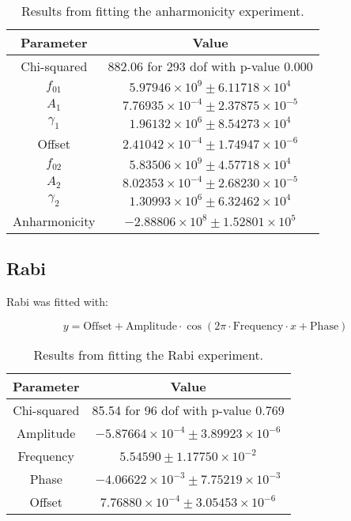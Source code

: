 \begin{table}[h]
\centering
\begin{tabular}{|c|c|}
\hline
Parameter & Value \\
\hline
Chi-squared & 882.06 for 293 dof with p-value 0.000 \\
$f_{01}$ & $5.97946 \times 10^9 \pm 6.11718 \times 10^4$ \\
$A_1$ & $7.76935 \times 10^{-4} \pm 2.37875 \times 10^{-5}$ \\
$\gamma_1$ & $1.96132 \times 10^6 \pm 8.54273 \times 10^4$ \\
Offset & $2.41042 \times 10^{-4} \pm 1.74947 \times 10^{-6}$ \\
$f_{02}$ & $5.83506 \times 10^9 \pm 4.57718 \times 10^4$ \\
$A_2$ & $8.02353 \times 10^{-4} \pm 2.68230 \times 10^{-5}$ \\
$\gamma_2$ & $1.30993 \times 10^6 \pm 6.32462 \times 10^4$ \\
Anharmonicity & $-2.88806 \times 10^8 \pm 1.52801 \times 10^5$ \\
\hline
\end{tabular}
\caption{Results from fitting the anharmonicity experiment.}
\label{tab:fit_outcomes_fourth}
\end{table}
\FloatBarrier


\subsection{Rabi}
Rabi was fitted with:
\begin{fullwidth}
\begin{equation}
    y = \text{Offset} + \text{Amplitude} \cdot \cos\left(2\pi \cdot \text{Frequency}\cdot x + \text{Phase}\right) 
\end{equation}
\end{fullwidth}
\FloatBarrier
\begin{table}[h]
\centering
\begin{tabular}{|c|c|}
\hline
Parameter & Value \\
\hline
Chi-squared & 85.54 for 96 dof with p-value 0.769 \\
Amplitude & $-5.87664 \times 10^{-4} \pm 3.89923 \times 10^{-6}$ \\
Frequency & $5.54590 \pm 1.17750 \times 10^{-2}$ \\
Phase & $-4.06622 \times 10^{-3} \pm 7.75219 \times 10^{-3}$ \\
Offset & $7.76880 \times 10^{-4} \pm 3.05453 \times 10^{-6}$ \\
\hline
\end{tabular}
\caption{Results from fitting the Rabi experiment.}
\label{tab:fit_outcomes_second}
\end{table}



